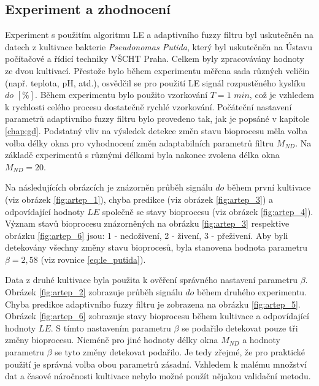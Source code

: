 \subsection{Experiment a zhodnocení}
Experiment s použitím algoritmu LE a adaptivního fuzzy filtru byl uskutečněn na datech z kultivace bakterie \textit{Pseudonomas Putida}, který byl uskutečněn na Ústavu počítačové a řídicí techniky VŠCHT Praha. Celkem byly zpracovávány hodnoty ze dvou kultivací. Přestože bylo během experimentu měřena sada různých veličin (např. teplota, pH, atd.), osvědčil se pro použití LE signál rozpustěného kyslíku $do$ $[\%]$. Během experimentu bylo použito vzorkování $T=1$ $min$, což je vzhledem k rychlosti celého procesu dostatečně rychlé vzorkování. Počáteční nastavení parametrů adaptivního fuzzy filtru bylo provedeno tak, jak je popsáné v kapitole \ref{chap:gd}. Podstatný vliv na výsledek detekce změn stavu bioprocesu měla volba volba délky okna pro vyhodnocení změn adaptabilních parametrů filtru $M_{ND}$. Na základě experimentů s různými délkami byla nakonec zvolena délka okna $M_{ND}=20$.
\par
Na následujících obrázcích je znázorněn průběh signálu $do$ během první kultivace (viz obrázek \ref{fig:artep_1}), chyba predikce (viz obrázek \ref{fig:artep_3}) a odpovídající hodnoty $LE$ společně se stavy bioprocesu (viz obrázek \ref{fig:artep_4}). Význam stavů bioprocesu znázorněných na obrázku \ref{fig:artep_3} respektive obrázku \ref{fig:artep_6} jsou: 1 - nedoživení, 2 - živení, 3 - přeživení. Aby byli detekovány všechny změny stavu bioprocesů, byla stanovena hodnota parametru $\beta=2,58$ (viz rovnice \ref{eq:le_putida}).
\par
Data z druhé kultivace byla použita k ověření správného nastavení parametru $\beta$.  Obrázek \ref{fig:artep_2} zobrazuje průběh signálu $do$ během druhého experimentu. Chyba predikce adaptivního fuzzy filtru je zobrazena na obrázku \ref{fig:artep_5}.  Obrázek \ref{fig:artep_6} zobrazuje stavy bioprocesu během kultivace a odpovídající hodnoty $LE$. S tímto nastavením parametru $\beta$ se podařilo detekovat pouze tři změny bioprocesu. Nicméně pro jiné hodnoty délky okna $M_{ND}$ a hodnoty parametru $\beta$ se tyto změny detekovat podařilo. Je tedy zřejmé, že pro praktické použití je správná volba obou parametrů zásadní. Vzhledem k malému množství dat a časové náročnosti kultivace nebylo možné použít nějakou validační metodu. 

